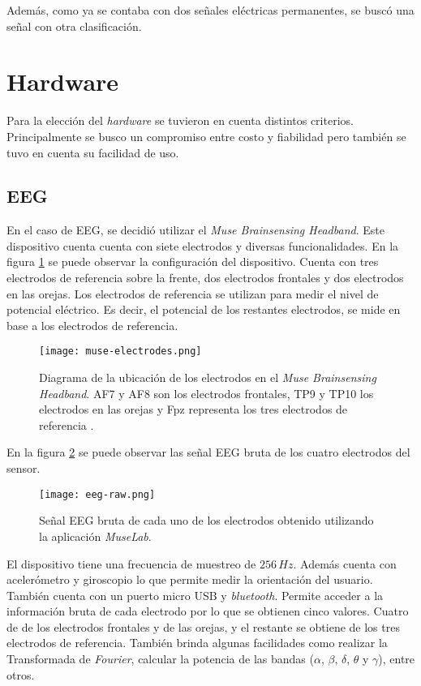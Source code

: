 Además, como ya se contaba con dos señales eléctricas permanentes, se buscó una señal con otra clasificación.

\section{Hardware}

 Para la elección del \emph{hardware} se tuvieron en cuenta distintos criterios. Principalmente se busco un compromiso entre costo y fiabilidad pero también se tuvo en cuenta su facilidad de uso.

\subsection{EEG}

En el caso de EEG, se decidió utilizar el \emph{Muse Brainsensing Headband}. Este dispositivo cuenta cuenta con siete electrodos y diversas funcionalidades. En la figura \ref{fig:muse-electrodes} se puede observar la configuración del dispositivo. Cuenta con tres electrodos de referencia sobre la frente, dos electrodos frontales y dos electrodos en las orejas. Los electrodos de referencia se utilizan para medir el nivel de potencial eléctrico. Es decir, el potencial de los restantes electrodos, se mide en base a los electrodos de referencia.

\begin{figure}[H]
	\centering
    \texttt{[image: muse-electrodes.png]}
    \caption{Diagrama de la ubicación de los electrodos en el \emph{Muse Brainsensing Headband}. AF7 y AF8 son los electrodos frontales, TP9 y TP10 los electrodos en las orejas y Fpz representa los tres electrodos de referencia \cite{muse-hardware}.}
	\label{fig:muse-electrodes}
\end{figure}

En la figura \ref{fig:eeg-raw} se puede observar las señal EEG bruta de los cuatro electrodos del sensor.

\begin{figure}[H]
	\centering
    \texttt{[image: eeg-raw.png]}
    \caption{Señal EEG bruta de cada uno de los electrodos obtenido utilizando la aplicación \emph{MuseLab}.}
	\label{fig:eeg-raw}
\end{figure}

El dispositivo tiene una frecuencia de muestreo de $ 256 \, Hz$. Además cuenta con acelerómetro y giroscopio lo que permite medir la orientación del usuario. También cuenta con un puerto micro USB y \emph{bluetooth}. Permite acceder a la información bruta de cada electrodo por lo que se obtienen cinco valores. Cuatro de de los electrodos frontales y de las orejas, y el restante se obtiene de los tres electrodos de referencia. También brinda algunas facilidades como realizar la Transformada de \emph{Fourier},  calcular la potencia de las bandas ($\alpha$, $\beta$, $\delta$, $\theta$ y $\gamma$), entre otros.


